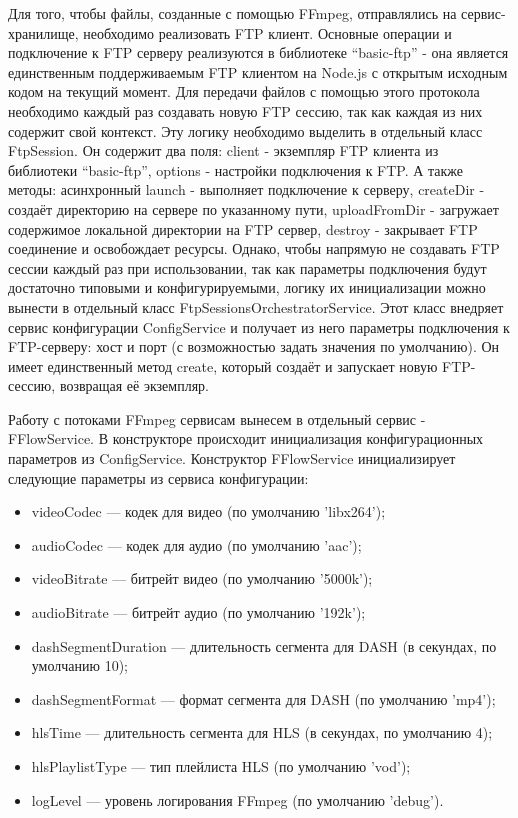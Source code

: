 	Для того, чтобы файлы, созданные с помощью FFmpeg, отправлялись на сервис-хранилище, необходимо реализовать FTP клиент. Основные операции и подключение к FTP серверу реализуются в библиотеке “basic-ftp” - она является единственным поддерживаемым FTP клиентом на Node.js с открытым исходным кодом на текущий момент. Для передачи файлов с помощью этого протокола необходимо каждый раз создавать новую FTP сессию, так как каждая из них содержит свой контекст. Эту логику необходимо выделить в отдельный класс FtpSession. Он содержит два поля: client - экземпляр FTP клиента из библиотеки “basic-ftp”, options - настройки подключения к FTP. А также методы: асинхронный launch - выполняет подключение к серверу, createDir - создаёт директорию на сервере по указанному пути, uploadFromDir - загружает содержимое локальной директории на FTP сервер, destroy - закрывает FTP соединение и освобождает ресурсы. Однако, чтобы напрямую не создавать FTP сессии каждый раз при использовании, так как параметры подключения будут достаточно типовыми и конфигурируемыми, логику их инициализации можно вынести в отдельный класс FtpSessionsOrchestratorService. Этот класс внедряет сервис конфигурации ConfigService и получает из него параметры подключения к FTP-серверу: хост и порт (с возможностью задать значения по умолчанию). Он имеет единственный метод create, который создаёт и запускает новую FTP-сессию, возвращая её экземпляр.

	Работу с потоками FFmpeg сервисам вынесем в отдельный сервис - FFlowService. В конструкторе происходит инициализация конфигурационных параметров из ConfigService. Конструктор FFlowService инициализирует следующие параметры из сервиса конфигурации:

	\begin{itemize}[label=$\bullet$]
		\item videoCodec — кодек для видео (по умолчанию 'libx264');
		\item audioCodec — кодек для аудио (по умолчанию 'aac');
		\item videoBitrate — битрейт видео (по умолчанию '5000k');
		\item audioBitrate — битрейт аудио (по умолчанию '192k');
		\item dashSegmentDuration — длительность сегмента для DASH (в секундах, по умолчанию 10);
		\item dashSegmentFormat — формат сегмента для DASH (по умолчанию 'mp4');
		\item hlsTime — длительность сегмента для HLS (в секундах, по умолчанию 4);
		\item hlsPlaylistType — тип плейлиста HLS (по умолчанию 'vod');
		\item logLevel — уровень логирования FFmpeg (по умолчанию 'debug').
	\end{itemize}

